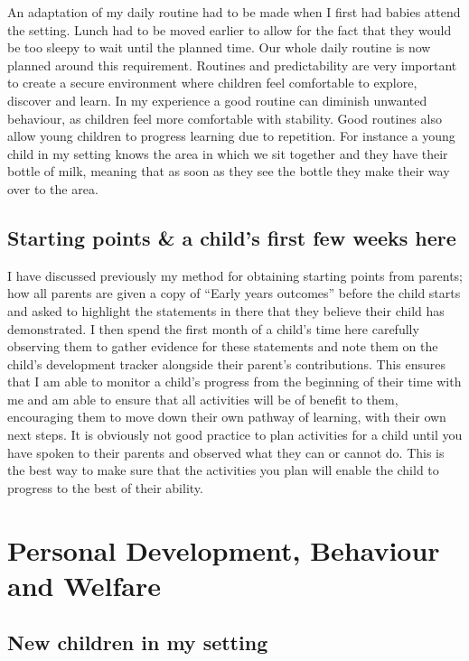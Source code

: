 \documentclass[10pt,a4paper]{report}
\begin{document}
An adaptation of my daily routine had to be made when I first had babies attend the setting. Lunch had to be moved earlier to allow for the fact that they would be too sleepy to wait until the planned time. Our whole daily routine is now planned around this requirement. Routines and predictability are very important to create a secure environment where children feel comfortable to explore, discover and learn. In my experience a good routine can diminish unwanted  behaviour, as children feel more comfortable with stability. Good routines also allow young children to progress learning due to repetition. For instance a young child in my setting knows the area in which we sit together and they have their bottle of milk, meaning that as soon as they see the bottle they make their way over to the area. 

\section{Starting points \& a child's first few weeks here}

I have discussed previously my method for obtaining starting points from parents; how all parents are given a copy of “Early years outcomes” before the child starts and asked to highlight the statements in there that they believe their child has demonstrated. I then spend the first month of a child's time here carefully observing them to gather evidence for these statements and note them on the child's development tracker alongside their parent's contributions. This ensures that I am able to monitor a child's progress from the beginning of their time with me and am able to ensure that all activities will be of benefit to them, encouraging them to move down their own pathway of learning, with their own next steps. It is obviously not good practice to plan activities for a child until you have spoken to their parents and observed what they can or cannot do. This is the best way to make sure that the activities you plan will enable the child to progress to the best of their ability.

\chapter{Personal Development, Behaviour and Welfare}

\section{New children in my setting}
\end{document}
